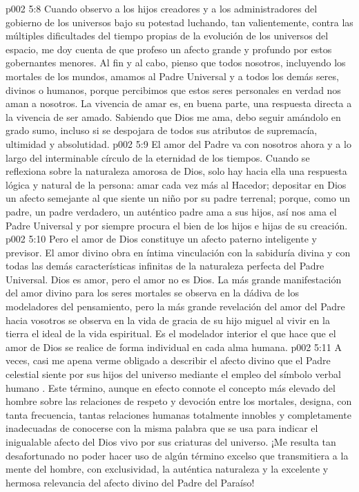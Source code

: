 \vs p002 5:8 Cuando observo a los hijos creadores y a los administradores del gobierno de los universos bajo su potestad luchando, tan valientemente, contra las múltiples dificultades del tiempo propias de la evolución de los universos del espacio, me doy cuenta de que profeso un afecto grande y profundo por estos gobernantes menores. Al fin y al cabo, pienso que todos nosotros, incluyendo los mortales de los mundos, amamos al Padre Universal y a todos los demás seres, divinos o humanos, porque percibimos que estos seres personales en verdad nos aman a nosotros. La vivencia de amar es, en buena parte, una respuesta directa a la vivencia de ser amado. Sabiendo que Dios me ama, debo seguir amándolo en grado sumo, incluso si se despojara de todos sus atributos de supremacía, ultimidad y absolutidad.
\vs p002 5:9 El amor del Padre va con nosotros ahora y a lo largo del interminable círculo de la eternidad de los tiempos. Cuando se reflexiona sobre la naturaleza amorosa de Dios, solo hay hacia ella una respuesta lógica y natural de la persona: amar cada vez más al Hacedor; depositar en Dios un afecto semejante al que siente un niño por su padre terrenal; porque, como un padre, un padre verdadero, un auténtico padre ama a sus hijos, así nos ama el Padre Universal y por siempre procura el bien de los hijos e hijas de su creación.
\vs p002 5:10 Pero el amor de Dios constituye un afecto paterno inteligente y previsor. El amor divino obra en íntima vinculación con la sabiduría divina y con todas las demás características infinitas de la naturaleza perfecta del Padre Universal. Dios es amor, pero el amor no es Dios. La más grande manifestación del amor divino para los seres mortales se observa en la dádiva de los modeladores del pensamiento, pero la más grande revelación del amor del Padre hacia vosotros se observa en la vida de gracia de su hijo miguel al vivir en la tierra el ideal de la vida espiritual. Es el modelador interior el que hace que el amor de Dios se realice de forma individual en cada alma humana.
\vs p002 5:11 \pc A veces, casi me apena verme obligado a describir el afecto divino que el Padre celestial siente por sus hijos del universo mediante el empleo del símbolo verbal humano . Este término, aunque en efecto connote el concepto más elevado del hombre sobre las relaciones de respeto y devoción entre los mortales, designa, con tanta frecuencia, tantas relaciones humanas totalmente innobles y completamente inadecuadas de conocerse con la misma palabra que se usa para indicar el inigualable afecto del Dios vivo por sus criaturas del universo. ¡Me resulta tan desafortunado no poder hacer uso de algún término excelso que transmitiera a la mente del hombre, con exclusividad, la auténtica naturaleza y la excelente y hermosa relevancia del afecto divino del Padre del Paraíso!
